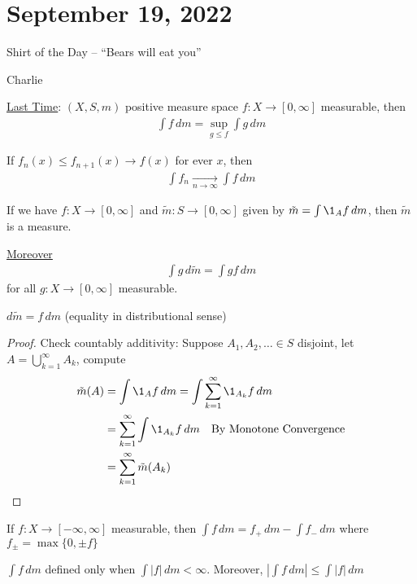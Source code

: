 \section{September 19, 2022}

\epigraph{Shirt of the Day -- ``Bears will eat you''}{Charlie}

\noindent\underline{Last Time}:
$(X, S, m)$ positive measure space $f : X \to [0,\infty]$ measurable, then
\begin{align*}
	\int f \, dm = \sup_{g \leq f} \int g \, dm
\end{align*}


\begin{theorem}
	If $f_n(x) \leq f_{n+1}(x) \to f(x)$ for ever $x$, then
	\begin{align*}
		\int f_n \xrightarrow[n \to \infty]{} \int f \, dm
	\end{align*}
\end{theorem}

\begin{corollary}
	If we have $f: X \to [0,\infty]$ and $\tilde{m} : S \to [0,\infty]$ given by $\tilde{m} = \int \1_A f \, dm$, then $\tilde{m}$ is a measure.

	\underline{Moreover}
	\begin{align*}
		\int g \, d\tilde{m} = \int g f \, dm
	\end{align*} for all $g :X \to [0,\infty]$ measurable.

\end{corollary}

\begin{notation}
	$d \tilde{m} = f \, dm$ (equality in distributional sense)
\end{notation}

\begin{proof}
	Check countably additivity:
	Suppose $A_1, A_2, \ldots \in S$ disjoint, let  $A = \bigcup_{k=1}^{\infty} A_k$, compute
	\begin{align*}
		\tilde{m}(A) &= \int \1_{A} f \, dm
					 = \int \sum_{k=1}^{\infty} \1_{A_k} f \, dm \\
					 &= \sum_{k=1}^{\infty} \int \1_{A_k} f \, dm \quad \text{By Monotone Convergence} \\
					 &=  \sum_{k=1}^{\infty} \tilde{m}( A_k )
	\end{align*}
\end{proof}

\begin{definition}
	If $f: X \to [ - \infty, \infty]$ measurable, then  $\int f \, dm = f_{+} \, dm - \int f_{-} \, dm$ where
	$f_{\pm} = \max\{0, \pm f\}$
\begin{remark}
	$\int f \, dm$ defined only when $\int |f| \, dm < \infty$. Moreover,  $|\int f \, dm | \leq \int |f| \, dm$
\end{remark}
\end{definition}

